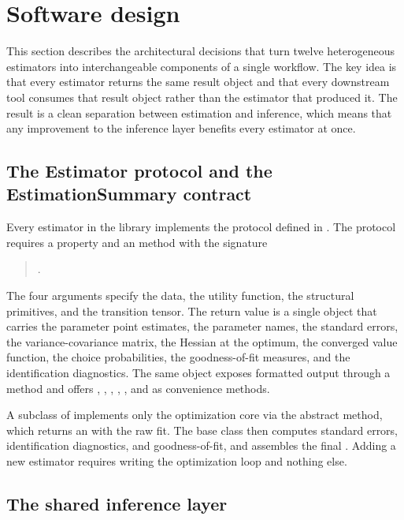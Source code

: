 \section{Software design} \label{sec:design}

This section describes the architectural decisions that turn twelve heterogeneous estimators into interchangeable components of a single workflow. The key idea is that every estimator returns the same result object and that every downstream tool consumes that result object rather than the estimator that produced it. The result is a clean separation between estimation and inference, which means that any improvement to the inference layer benefits every estimator at once.

\subsection{The Estimator protocol and the EstimationSummary contract}

Every estimator in the library implements the  protocol defined in . The protocol requires a  property and an  method with the signature
\begin{quote}
.
\end{quote}
The four arguments specify the data, the utility function, the structural primitives, and the transition tensor. The return value is a single object that carries the parameter point estimates, the parameter names, the standard errors, the variance-covariance matrix, the Hessian at the optimum, the converged value function, the choice probabilities, the goodness-of-fit measures, and the identification diagnostics. The same object exposes formatted output through a  method and offers , , , , , and  as convenience methods.

A subclass of  implements only the optimization core via the abstract  method, which returns an  with the raw fit. The base class then computes standard errors, identification diagnostics, and goodness-of-fit, and assembles the final . Adding a new estimator requires writing the optimization loop and nothing else.

\subsection{The shared inference layer}

